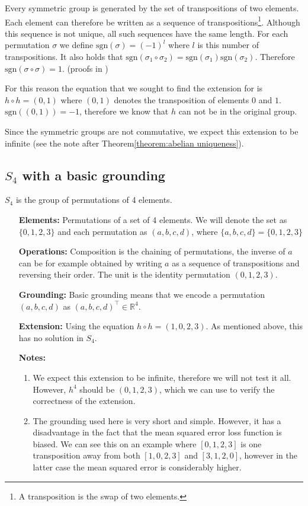 Every symmetric group is generated by the set of transpositions of two elements. Each element can therefore be written as a sequence of transpositions\footnote{A transposition is the swap of two elements.}. Although this sequence is not unique, all such sequences have the same length. For each permutation $\sigma$ we define $\text{sgn}(\sigma)=(-1)^l$ where $l$ is this number of transpositions. It also holds that $\text{sgn}(\sigma_1\circ\sigma_2)=\text{sgn}(\sigma_1)\text{sgn}(\sigma_2)$. Therefore $\text{sgn}(\sigma\circ\sigma)=1$. (proofs in \cite{Lingebra})

For this reason the equation that we sought to find the extension for is $h\circ h=(0,1)$ where $(0,1)$ denotes the transposition of elements $0$ and $1$. $\text{sgn}((0,1))=-1$, therefore we know that $h$ can not be in the original group. 

Since the symmetric groups are not commutative, we expect this extension to be infinite (see the note after Theorem\autoref{theorem:abelian uniqueness}).

\subsection{$S_4$ with a basic grounding}
$S_4$ is the group of permutations of 4 elements. 

\begin{itemize}
	\item[\textbf{Elements:}] Permutations of a set of 4 elements. We will denote the set as $\{0,1,2,3\}$ and each permutation as $(a,b,c,d)$, where $\{a,b,c,d\}=\{0,1,2,3\}$
	\item[\textbf{Operations:}] Composition is the chaining of permutations, the inverse  of $a$ can be for example obtained by writing $a$ as a sequence of transpositions and reversing their order. The unit is the identity permutation $(0,1,2,3)$.
	\item[\textbf{Grounding:}] Basic grounding means that we encode a permutation $(a,b,c,d)$ as $(a,b,c,d)^\top \in \mathbb{R}^4$.
	\item[\textbf{Extension:}] Using the equation $h\circ h=(1,0,2,3)$. As mentioned above, this has no solution in $S_4$.
	\item[\textbf{Notes:}] 
	\begin{enumerate}
		\item We expect this extension to be infinite, therefore we will not test it all. However, $h^4$ should be $(0,1,2,3)$, which we can use to verify the correctness of the extension.
	
	\item The grounding used here is very short and simple. However, it has a disadvantage in the fact that the mean squared error loss function is biased. We can see this on an example where $[0,1,2,3]$ is one transposition away from both $[1,0,2,3]$ and $[3,1,2,0]$, however in the latter case the mean squared error is considerably higher.
	\end{enumerate}
\end{itemize}


